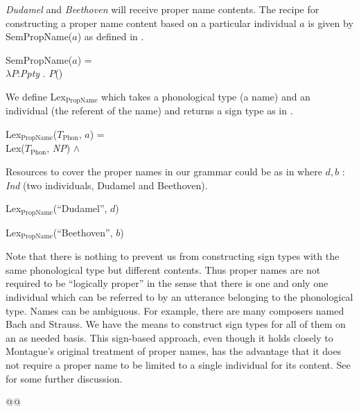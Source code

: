 \textit{Dudamel} and
\textit{Beethoven} will receive proper name contents.  The recipe for
constructing a proper name content based on a particular individual
$a$ is given by SemPropName($a$) as defined in \nexteg{}.
\begin{ex} 
SemPropName($a$) = \\
\hspace*{1em}$\lambda P$:\textit{Ppty} . $P$() 
\end{ex} 
We define Lex$_{\mathrm{PropName}}$ which takes a phonological type (a
name) and an individual (the referent of the name) and returns a sign
type as in \nexteg{}.
\begin{ex} 
Lex$_{\mathrm{PropName}}$($T_{\mathrm{Phon}}$, $a$) = \\
\hspace*{1em}Lex($T_{\mathrm{Phon}}$, \textit{NP}) \d{$\wedge$}  
\end{ex} 
Resources to cover the proper names in our grammar could be as in
\nexteg{} where $d,b$ : \textit{Ind} (two individuals, Dudamel and
Beethoven).
\begin{ex} 
\begin{subex} 
 
\item Lex$_{\mathrm{PropName}}$(``Dudamel'', $d$) 
 
\item Lex$_{\mathrm{PropName}}$(``Beethoven'', $b$) 
 
\end{subex} 
   
\end{ex} 
Note that there is nothing to prevent us from constructing sign types
with the same phonological type but different contents.  Thus proper
names are not required to be ``logically proper'' in the sense that
there is one and only one individual which can be referred to by an
utterance belonging to the phonological type.  Names can be ambiguous.
For example, there are many composers named Bach and Strauss.  We have
the means to construct sign types for all of them on an as needed
basis.  This sign-based approach, even though it holds closely to
Montague's original treatment of proper names, has the advantage that
it does not require a proper name to be limited to a single individual
for its content.  See \cite{Cooper2017a} for some further discussion.

@@

